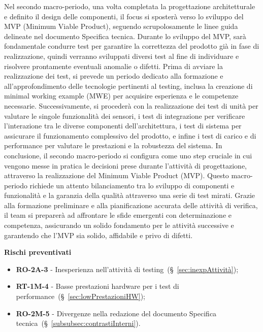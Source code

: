 \vspace{0.2cm}

Nel secondo macro-periodo, una volta completata la progettazione architetturale e definito il design delle componenti, il focus si sposterà verso lo sviluppo del MVP (Minimum Viable Product), seguendo scrupolosamente le linee guida delineate nel documento Specifica tecnica. Durante lo sviluppo del MVP, sarà fondamentale condurre test per garantire la correttezza del prodotto già in fase di realizzazione, quindi verranno sviluppati diversi test al fine di individuare e risolvere prontamente eventuali anomalie o difetti.
Prima di avviare la realizzazione dei test, si prevede un periodo dedicato alla formazione e all'approfondimento delle tecnologie pertinenti al testing, inclusa la creazione di minimal working example (MWE) per acquisire esperienza e le competenze necessarie.
Successivamente, si procederà con la realizzazione dei test di unità per valutare le singole funzionalità dei sensori, i test di integrazione per verificare l'interazione tra le diverse componenti dell'architettura, i test di sistema per assicurare il funzionamento complessivo del prodotto, e infine i test di carico e di performance per valutare le prestazioni e la robustezza del sistema.
In conclusione, il secondo macro-periodo si configura come uno step cruciale in cui vengono messe in pratica le decisioni prese durante l’attività di progettazione, attraverso la realizzazione del Minimum Viable Product (MVP). Questo macro-periodo richiede un attento bilanciamento tra lo sviluppo di componenti e funzionalità e la garanzia della qualità attraverso una serie di test mirati. Grazie alla formazione preliminare e alla pianificazione accurata delle attività di verifica, il team si preparerà ad affrontare le sfide emergenti con determinazione e competenza, assicurando un solido fondamento per le attività successive e garantendo che l'MVP sia solido, affidabile e privo di difetti.

\vspace{0.4cm}

\textbf{Rischi preventivati}
\begin{itemize}
    \item \textbf{RO-2A-3} - Inesperienza nell’attività di testing~(\S~\ref{sec:inexpAttività});
    \item \textbf{RT-1M-4} - Basse prestazioni hardware per i test di performance~(\S~\ref{sec:lowPrestazioniHW});
    \item \textbf{RO-2M-5} - Divergenze nella redazione del documento Specifica tecnica~(\S~\ref{subsubsec:contrastiInterni}).
\end{itemize}

